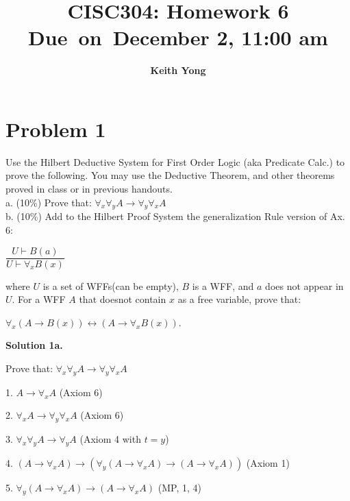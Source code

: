 \documentclass{article}
\title{
	\vspace{2in}
	\textmd{\textbf{CISC304: Homework 6}}\\
	\normalsize\vspace{0.1in}\small{Due\ on\ December 2, 11:00 am}\\
	\vspace{3in}
}
\author{\textbf{Keith Yong}}
\date{}
\newcommand{\tOne}{7.5cm}
\begin{document}
\maketitle
\pagebreak

\section*{Problem 1}
Use the Hilbert Deductive System for First Order Logic (aka Predicate Calc.) to prove the following. You may use the Deductive Theorem, and other theorems proved in class or in previous handouts.\\

a. (10\%) Prove that: $\forall_{x}\forall_{y}A \rightarrow \forall_{y}\forall_{x}A$\\

b. (10\%) Add to the Hilbert Proof System the generalization Rule version of Ax. 6: 

\begin{center}
$\dfrac{U \vdash B(a)}{U \vdash \forall_xB(x)}$
\end{center}

where $U$ is a set of WFFs(can be empty), $B$ is a WFF, and $a$ does not appear in $U$. For a WFF $A$ that doesnot contain $x$ as a free variable, prove that:

\begin{center}
$\forall_x(A \rightarrow B(x)) \leftrightarrow (A \rightarrow \forall_xB(x))$.\\
\end{center}

\textbf{\large{Solution 1a.}}

Prove that: $\forall_{x}\forall_{y}A \rightarrow \forall_{y}\forall_{x}A$

1. $A \rightarrow \forall_xA$ \tabto{\tOne}(Axiom 6)

2. $\forall_xA \rightarrow \forall_y\forall_xA$ \tabto{\tOne}(Axiom 6)

3. $\forall_x\forall_yA \rightarrow \forall_yA$ \tabto{\tOne}(Axiom 4 with $t = y$)

4. $(A \rightarrow \forall_xA) \rightarrow (\forall_y(A \rightarrow \forall_xA) \rightarrow (A \rightarrow \forall_xA))$ \tabto{\tOne}(Axiom 1)

5. $\forall_y(A \rightarrow \forall_xA) \rightarrow (A \rightarrow \forall_x A)$ \tabto{\tOne}(MP, 1, 4)
\end{document}
